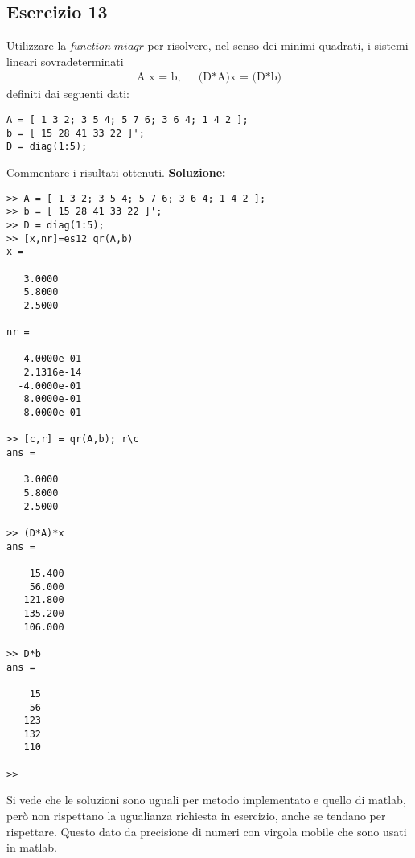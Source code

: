 \subsection{Esercizio 13}
Utilizzare la \textit{function} $miaqr$ per risolvere, nel senso dei minimi quadrati,
i sistemi lineari sovradeterminati
\begin{eqnarray*}
    \mbox{A x = b,} & & \mbox{(D*A)x = (D*b)}
\end{eqnarray*}
definiti dai seguenti dati:
\begin{lstlisting}
A = [ 1 3 2; 3 5 4; 5 7 6; 3 6 4; 1 4 2 ];
b = [ 15 28 41 33 22 ]';
D = diag(1:5);
\end{lstlisting}
Commentare i risultati ottenuti.
\newline \textbf{Soluzione:}
\begin{lstlisting}
>> A = [ 1 3 2; 3 5 4; 5 7 6; 3 6 4; 1 4 2 ];
>> b = [ 15 28 41 33 22 ]';
>> D = diag(1:5);
>> [x,nr]=es12_qr(A,b)
x =

   3.0000
   5.8000
  -2.5000

nr =

   4.0000e-01
   2.1316e-14
  -4.0000e-01
   8.0000e-01
  -8.0000e-01

>> [c,r] = qr(A,b); r\c
ans =

   3.0000
   5.8000
  -2.5000

>> (D*A)*x
ans =

    15.400
    56.000
   121.800
   135.200
   106.000

>> D*b
ans =

    15
    56
   123
   132
   110

>>
\end{lstlisting}

Si vede che le soluzioni sono uguali per metodo implementato e quello di matlab,
però non rispettano la ugualianza richiesta in esercizio, anche se tendano per rispettare.
Questo dato da precisione di numeri con virgola mobile che sono usati in matlab.
